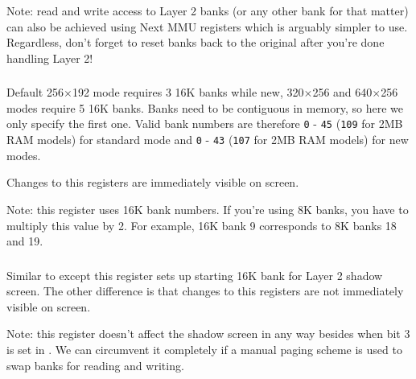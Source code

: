 Note: read and write access to Layer 2 banks (or any other bank for that matter) can also be achieved using Next MMU registers which is arguably simpler to use. Regardless, don't forget to reset banks back to the original after you're done handling Layer 2!


\subsubsection{}

\begin{NextPort}
\end{NextPort}

Default 256$\times$192 mode requires 3 16K banks while new, 320$\times$256 and 640$\times$256 modes require 5 16K banks. Banks need to be contiguous in memory, so here we only specify the first one. Valid bank numbers are therefore {\tt 0} - {\tt 45} ({\tt 109} for 2MB RAM models) for standard mode and {\tt 0} - {\tt 43} ({\tt 107} for 2MB RAM models) for new modes.

Changes to this registers are immediately visible on screen.

Note: this register uses 16K bank numbers. If you're using 8K banks, you have to multiply this value by 2. For example, 16K bank 9 corresponds to 8K banks 18 and 19.


\subsubsection{}

\begin{NextPort}
\end{NextPort}

Similar to  except this register sets up starting 16K bank for Layer 2 shadow screen. The other difference is that changes to this registers are not immediately visible on screen.

Note: this register doesn't affect the shadow screen in any way besides when bit 3 is set in . We can circumvent it completely if a manual paging scheme is used to swap banks for reading and writing.

